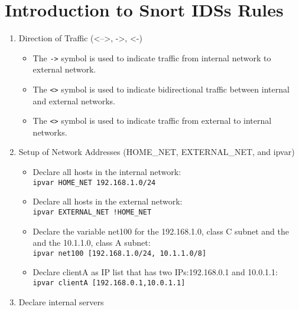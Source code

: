 \documentclass[]{report}
\providecommand{\tightlist}{%
  \setlength{\itemsep}{0pt}\setlength{\parskip}{0pt}}
\begin{document}
\hypertarget{introduction-to-snort-idss-rules}{%
\chapter{Introduction to Snort IDSs
Rules}\label{introduction-to-snort-idss-rules}}

\begin{enumerate}
\def\labelenumi{\arabic{enumi}.}
\tightlist
\item
  Direction of Traffic (\textless--\textgreater, -\textgreater,
  \textless-)

  \begin{itemize}
  \tightlist
  \item
    The \texttt{-\textgreater{}} symbol is used to indicate traffic from
    internal network to external network.
  \item
    The \texttt{\textless{}\textgreater{}} symbol is used to indicate
    bidirectional traffic between internal and external networks.
  \item
    The \texttt{\textless{}\textgreater{}} symbol is used to indicate
    traffic from external to internal networks.
  \end{itemize}
\item
  Setup of Network Addresses (HOME\_NET, EXTERNAL\_NET, and ipvar)

  \begin{itemize}
  \tightlist
  \item
    Declare all hosts in the internal network:
    \texttt{ipvar\ HOME\_NET\ 192.168.1.0/24}
  \item
    Declare all hosts in the external network:
    \texttt{ipvar\ EXTERNAL\_NET\ !HOME\_NET}
  \item
    Declare the variable net100 for the 192.168.1.0, class C subnet and
    the and the 10.1.1.0, class A subnet:
    \texttt{ipvar\ net100\ {[}192.168.1.0/24,\ 10.1.1.0/8{]}}
  \item
    Declare clientA as IP list that has two IPs:192.168.0.1 and
    10.0.1.1: \texttt{ipvar\ clientA\ {[}192.168.0.1,10.0.1.1{]}}
  \end{itemize}
\item
  Declare internal servers


\end{enumerate}
\end{document}
